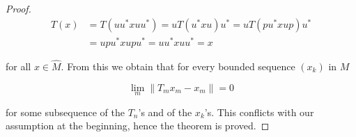 \begin{proof}
\begin{align*}
T(x) &= T(uu^*xuu^*) = uT(u^*xu)u^* = uT(pu^*xup)u^* \\
&= upu^*xupu^* = uu^*xuu^* = x
\end{align*}

for all $x \in \widehat{M}$.
From this we obtain that for every bounded sequence $(x_k)$ in $M$

\[
\lim_m \|T_m x_m - x_m\| = 0
\]

for some subsequence of the $T_n$'s and of the $x_k$'s.
This conflicts with our assumption at the beginning, hence the theorem is proved.
\end{proof}

